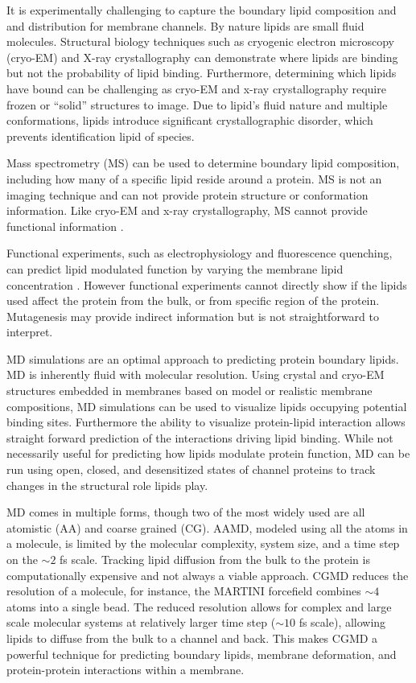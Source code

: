\documentclass[12pt]{ruthesis_nofloat}
\begin{document}
It is experimentally challenging to capture the boundary lipid composition and and distribution for membrane channels. By nature lipids are small fluid molecules. Structural biology techniques such as cryogenic electron microscopy (cryo-EM) and X-ray crystallography can demonstrate where lipids are binding \citep{Kumar2019,Henault2019} but not the probability of lipid binding. Furthermore, determining which lipids have bound can be challenging as cryo-EM and x-ray crystallography require frozen or ``solid'' structures to image. Due to lipid's fluid nature and multiple conformations, lipids introduce significant crystallographic disorder, which prevents identification lipid of species. 

Mass spectrometry (MS) can be used to determine boundary lipid composition, including how many of a specific lipid reside around a protein. MS is not an imaging technique and can not provide protein structure or conformation information. Like cryo-EM and x-ray crystallography, MS cannot provide functional information \citep{Lorenzen2010}. 
 
Functional experiments, such as electrophysiology and fluorescence quenching, can predict lipid modulated function by varying the membrane lipid concentration \citep{Criado1984}. However functional experiments cannot directly show if the lipids used affect the protein from the bulk, or from specific region of the protein. Mutagenesis may provide indirect information but is not straightforward to interpret.

MD simulations are an optimal approach to predicting protein boundary lipids. MD is inherently fluid with molecular resolution. Using crystal and cryo-EM structures embedded in membranes based on model or realistic membrane compositions, MD simulations can be used to visualize lipids occupying potential binding sites. Furthermore the ability to visualize protein-lipid interaction allows straight forward prediction of the interactions driving lipid binding. While not necessarily useful for predicting how lipids modulate protein function, MD can be run using open, closed, and desensitized states of channel proteins to track changes in the structural role lipids play. 

MD comes in multiple forms, though two of the most widely used are all atomistic (AA) and coarse grained (CG). AAMD, modeled using all the atoms in a molecule, is limited by the molecular complexity, system size, and a time step on the $\sim 2$ fs scale. Tracking lipid diffusion from the bulk to the protein is computationally expensive and not always a viable approach. CGMD reduces the resolution of a molecule, for instance, the MARTINI forcefield \citep{Marrink2007} combines $\sim4$ atoms into a single bead. The reduced resolution allows for complex and large scale molecular systems at relatively larger time step ($\sim10$ fs scale), allowing lipids to diffuse from the bulk to a channel and back. This makes CGMD a powerful technique for predicting boundary lipids, membrane deformation, and protein-protein interactions within a membrane.
\end{document}

